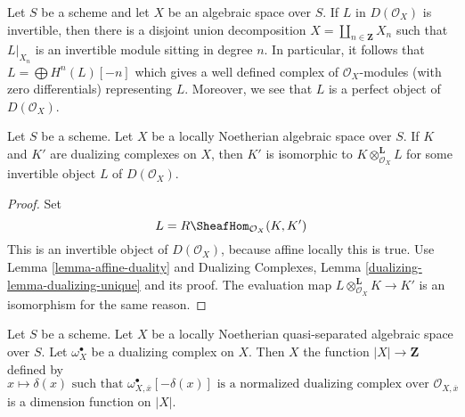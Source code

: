 \medskip\noindent
Let $S$ be a scheme and let $X$ be an algebraic space over $S$.
If $L$ in $D(\mathcal{O}_X)$ is invertible, then there is a
disjoint union decomposition $X = \coprod_{n \in \mathbf{Z}} X_n$
such that $L|_{X_n}$ is an invertible module sitting in degree $n$.
In particular, it follows that $L = \bigoplus H^n(L)[-n]$
which gives a well defined complex of $\mathcal{O}_X$-modules
(with zero differentials) representing $L$.
Moreover, we see that $L$ is a perfect object of $D(\mathcal{O}_X)$.

\begin{lemma}
\label{lemma-dualizing-unique-spaces}
Let $S$ be a scheme.
Let $X$ be a locally Noetherian algebraic space over $S$.
If $K$ and $K'$ are dualizing complexes on $X$, then $K'$
is isomorphic to $K \otimes_{\mathcal{O}_X}^\mathbf{L} L$
for some invertible object $L$ of $D(\mathcal{O}_X)$.
\end{lemma}

\begin{proof}
Set
$$
L = R\SheafHom_{\mathcal{O}_X}(K, K')
$$
This is an invertible object of $D(\mathcal{O}_X)$, because affine locally
this is true. Use Lemma \ref{lemma-affine-duality} and
Dualizing Complexes, Lemma
\ref{dualizing-lemma-dualizing-unique} and its proof.
The evaluation map $L \otimes_{\mathcal{O}_X}^\mathbf{L} K \to K'$
is an isomorphism for the same reason.
\end{proof}

\begin{lemma}
\label{lemma-dimension-function-scheme}
Let $S$ be a scheme. Let $X$ be a locally Noetherian
quasi-separated algebraic space over $S$.
Let $\omega_X^\bullet$ be a dualizing complex on $X$. Then $X$ the function
$|X| \to \mathbf{Z}$ defined by
$$
x \longmapsto \delta(x)\text{ such that }
\omega_{X, \overline{x}}^\bullet[-\delta(x)]
\text{ is a normalized dualizing complex over }
\mathcal{O}_{X, \overline{x}}
$$
is a dimension function on $|X|$.
\end{lemma}

